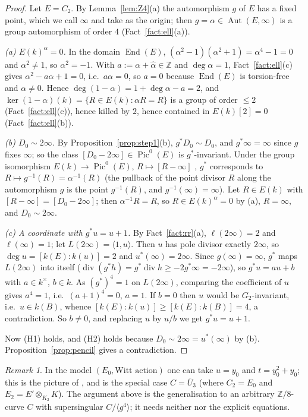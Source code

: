 \documentclass[11pt]{amsart}
\theoremstyle{definition}
\theoremstyle{remark}
\newtheorem{remark}[theorem]{Remark}
\newcommand{\Z}{\mathbb Z}
\newcommand{\Pic}{\operatorname{Pic}}
\newcommand{\Aut}{\operatorname{Aut}}
\newcommand{\End}{\operatorname{End}}
\newcommand{\divv}{\operatorname{div}}
\begin{document}
\begin{proof}
Let $E=C_2$. By Lemma~\ref{lem:Z4}(a) the automorphism $g$ of $E$ has a fixed point,
which we call $\infty$ and take as the origin; then $g=\alpha\in\Aut(E,\infty)$ is a
group automorphism of order $4$ (Fact~\ref{fact:ell}(a)).

\emph{(a) $E(k)^{\alpha}=0$.} In the domain $\End(E)$, $(\alpha^2-1)(\alpha^2+1)=\alpha^4-1=0$
and $\alpha^2\ne1$, so $\alpha^2=-1$. With $a:=\alpha+\hat\alpha\in\Z$ and $\deg\alpha=1$,
Fact~\ref{fact:ell}(c) gives $\alpha^2-a\alpha+1=0$, i.e.\ $a\alpha=0$, so $a=0$ because
$\End(E)$ is torsion-free and $\alpha\ne0$. Hence $\deg(1-\alpha)=1+\deg\alpha-a=2$, and
$\ker(1-\alpha)(k)=\{R\in E(k):\alpha R=R\}$ is a group of order $\le2$
(Fact~\ref{fact:ell}(c)), hence killed by $2$, hence contained in $E(k)[2]=0$
(Fact~\ref{fact:ell}(b)).

\emph{(b) $D_0\sim2\infty$.} By Proposition~\ref{prop:step1}(b), $g^*D_0\sim D_0$, and
$g^*\infty=\infty$ since $g$ fixes $\infty$; so the class $[D_0-2\infty]\in\Pic^0(E)$ is
$g^*$-invariant. Under the group isomorphism $E(k)\to\Pic^0(E)$, $R\mapsto[R-\infty]$
\cite[III.3.4]{Sil}, $g^*$ corresponds to $R\mapsto g^{-1}(R)=\alpha^{-1}(R)$ (the pullback
of the point divisor $R$ along the automorphism $g$ is the point $g^{-1}(R)$, and
$g^{-1}(\infty)=\infty$). Let $R\in E(k)$ with $[R-\infty]=[D_0-2\infty]$; then
$\alpha^{-1}R=R$, so $R\in E(k)^\alpha=0$ by (a), $R=\infty$, and $D_0\sim2\infty$.

\emph{(c) A coordinate with $g^*u=u+1$.} By Fact~\ref{fact:rr}(a), $\ell(2\infty)=2$ and
$\ell(\infty)=1$; let $L(2\infty)=\langle1,u\rangle$. Then $u$ has pole divisor exactly
$2\infty$, so $\deg u=[k(E):k(u)]=2$ and $u^*(\infty)=2\infty$. Since $g(\infty)=\infty$,
$g^*$ maps $L(2\infty)$ into itself ($\divv(g^*h)=g^*\divv h\ge-2g^*\infty=-2\infty$), so
$g^*u=au+b$ with $a\in k^\times$, $b\in k$. As $(g^*)^4=1$ on $L(2\infty)$, comparing the
coefficient of $u$ gives $a^4=1$, i.e.\ $(a+1)^4=0$, $a=1$. If $b=0$ then $u$ would be
$G_2$-invariant, i.e.\ $u\in k(B)$, whence $[k(E):k(u)]\ge[k(E):k(B)]=4$, a contradiction.
So $b\ne0$, and replacing $u$ by $u/b$ we get $g^*u=u+1$.

Now (H1) holds, and (H2) holds because $D_0\sim2\infty=u^*(\infty)$ by (b). Proposition~\ref{prop:pencil}
gives a contradiction.
\end{proof}

\begin{remark}
In the model $(E_0,\text{Witt action})$ one can take $u=y_0$ and $t=y_0^2+y_0$; this is
the picture of \cite[Theorem 6.2]{P}, and \cite[Corollary 11.7]{A} is the special case
$C=\bar U_3$ (where $C_2=E_0$ and $E_2=E'\otimes_{K_2}K$). The argument above is the
generalisation to an arbitrary $\Z/8$-curve $C$ with supersingular $C/\langle g^4\rangle$;
it needs neither \cite[Prop.~7.5]{P} nor the explicit equations.
\end{remark}
\end{document}

